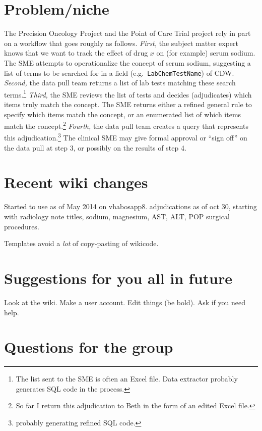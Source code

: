 \documentclass{tufte-handout}
\begin{document}
\section{Problem/niche}

The Precision Oncology Project and the Point of Care Trial project
rely in part on a workflow that goes roughly as follows. \emph{First,}
the subject matter expert knows that we want to track the effect of
drug $x$ on (for example) serum sodium. The SME attempts to
operationalize the concept of serum sodium, suggesting a list of terms
to be searched for in a field (e.g.\ \texttt{LabChemTestName}) of CDW.
\emph{Second,} the data pull team returns a list of lab tests matching
these search terms.\footnote{The list sent to the SME is often an
  Excel file. Data extractor probably generates SQL code in the
  process.} \emph{Third,} the SME reviews the list of tests and
decides (adjudicates) which items truly match the concept. The SME
returns either a refined general rule to specify which items match the
concept, or an enumerated list of which items match the
concept.\footnote{So far I return this adjudication to Beth in the
  form of an edited Excel file.} \emph{Fourth,} the data pull team
creates a query that represents this adjudication.\footnote{probably
  generating refined SQL code.} The clinical SME may give formal
approval or ``sign off'' on the data pull at step 3, or possibly on
the results of step 4.


\section{Recent wiki changes} 

Started to use as of May 2014 on vhabosapp8. adjudications as of oct
30, starting with radiology note titles, sodium, magnesium, AST, ALT,
POP surgical procedures.

Templates avoid a \emph{lot} of copy-pasting of wikicode.

\section{Suggestions for you all in future}

Look at the wiki. Make a user account. Edit things (be bold). Ask if
you need help.

\section{Questions for the group}
\end{document}
